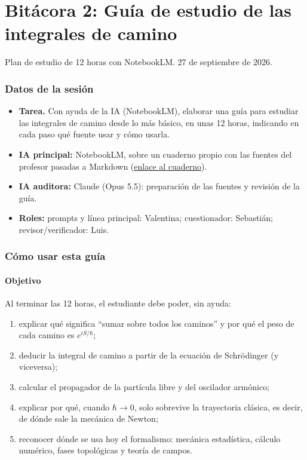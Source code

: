 
\part{Bitácora 2: Guía de estudio de las integrales de camino}
\setcounter{section}{0}
\begin{center}\normalsize Plan de estudio de 12 horas con NotebookLM. 27 de septiembre de 2026.\end{center}


\section{Datos de la sesión}

\begin{itemize}
    \item \textbf{Tarea.} Con ayuda de la IA (NotebookLM), elaborar una guía para estudiar las integrales de camino desde lo más básico, en unas 12 horas, indicando en cada paso qué fuente usar y cómo usarla.
    \item \textbf{IA principal:} NotebookLM, sobre un cuaderno propio con las fuentes del profesor pasadas a Markdown (\href{https://notebook.google.com/notebook/379b66c2-c80a-4d9d-8339-739a3fd3054b}{enlace al cuaderno}).
    \item \textbf{IA auditora:} Claude (Opus 5.5): preparación de las fuentes y revisión de la guía.
    \item \textbf{Roles:} prompts y línea principal: Valentina; cuestionador: Sebastián; revisor/verificador: Luis.
\end{itemize}

\section{Cómo usar esta guía}

\subsection{Objetivo}

Al terminar las 12 horas, el estudiante debe poder, sin ayuda:
\begin{enumerate}[label=(O\arabic*)]
    \item explicar qué significa ``sumar sobre todos los caminos'' y por qué el peso de cada camino es $e^{iS/\hbar}$;
    \item deducir la integral de camino a partir de la ecuación de Schrödinger (y viceversa);
    \item calcular el propagador de la partícula libre y del oscilador armónico;
    \item explicar por qué, cuando $\hbar\to0$, solo sobrevive la trayectoria clásica, es decir, de dónde sale la mecánica de Newton;
    \item reconocer dónde se usa hoy el formalismo: mecánica estadística, cálculo numérico, fases topológicas y teoría de campos.
\end{enumerate}


